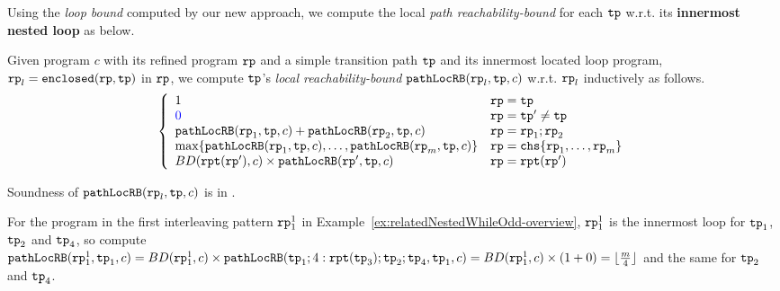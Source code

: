 Using the \emph{loop bound} computed by our new approach, we compute the local \emph{path reachability-bound} for
each $\mathtt{tp}$ w.r.t. its \textbf{innermost nested loop} as below.

\begin{defn}
 \label{def:pathlocalrb}
 Given program $c$ with its refined program $\mathtt{rp}$ and a simple transition path $\mathtt{tp}$ and its innermost located loop program, $\mathtt{rp}_l = \mathtt{enclosed}(\mathtt{rp}, \mathtt{tp})$ in $\mathtt{rp}$,
 we compute $\mathtt{tp}$'s \emph{local reachability-bound} $\mathtt{pathLocRB}(\mathtt{rp}_l, \mathtt{tp}, c)$ w.r.t. $\mathtt{rp}_l$ inductively as follows.
 {\small
 \[
 \left\{
 \begin{array}{ll}
 1 & \rprog = \tpath\\
 \highlight{0} & \rprog = \tpath' \neq \tpath\\
 \outinB(\rprog_1, \tpath, c) + \outinB(\rprog_2, \tpath, c) & \rprog = \rprog_1;\rprog_2 \\
 \max\left\{ \outinB(\rprog_1, \tpath, c), \ldots, \outinB(\rprog_m, \tpath, c) \right\} 
 & \rprog = \rpchoose{\rprog_1, \ldots, \rprog_m } \\
 BD(\rprepeat(\rprog'), c) \times \outinB(\rprog', \tpath, c) & \rprog = \rprepeat(\rprog')
 \end{array}
 \right.
 \]
 }
 \end{defn}
 Soundness of $\mathtt{pathLocRB}(\mathtt{rp}_l, \mathtt{tp}, c)$ is in .

 For the program in the first interleaving pattern $\mathtt{rp}_1^1$ in Example~\ref{ex:relatedNestedWhileOdd-overview}, $\mathtt{rp}_1^1$ is the innermost loop for $\mathtt{tp}_1$, $\mathtt{tp}_2$ and $\mathtt{tp}_4$, 
 so compute $\mathtt{pathLocRB}(\mathtt{rp}_1^1, \mathtt{tp}_1, c) = BD(\mathtt{rp}_1^1, c) \times \mathtt{pathLocRB}(\mathtt{tp}_1; 4:\mathtt{rpt}(\mathtt{tp}_3); \mathtt{tp}_2; \mathtt{tp}_4, \mathtt{tp}_1, c)
 = BD(\mathtt{rp}_1^1, c) \times (1 + 0) = \lfloor \frac{m}{4} \rfloor $ and the same for $\mathtt{tp}_2$ and $\mathtt{tp}_4$.

